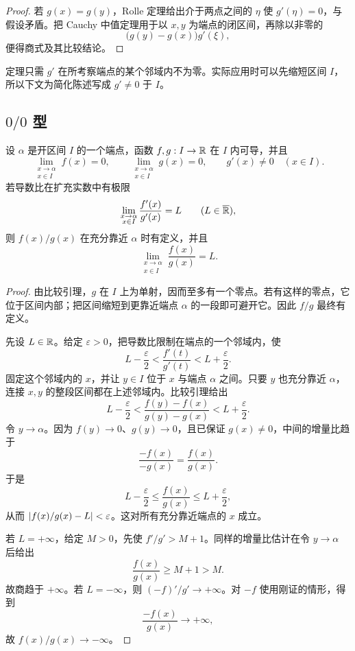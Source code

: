 \begin{proof}
若 \(g(x)=g(y)\)，Rolle 定理给出介于两点之间的 \(\eta\) 使 \(g'(\eta)=0\)，与假设矛盾。把 Cauchy 中值定理用于以 \(x,y\) 为端点的闭区间，再除以非零的
\[
 \bigl(g(y)-g(x)\bigr)g'(\xi),
\]
便得商式及其比较结论。
\end{proof}

定理只需 \(g'\) 在所考察端点的某个邻域内不为零。实际应用时可以先缩短区间 \(I\)，所以下文为简化陈述写成 \(g'\ne0\) 于 \(I\)。

\subsection{\texorpdfstring{\(0/0\)}{0/0} 型}

\begin{theorem}[L'Hôpital 法则：\(0/0\) 型]
\label{thm:lhopital-zero-zero}
设 \(\alpha\) 是开区间 \(I\) 的一个端点，函数 \(f,g:I\to\mathbb{R}\) 在 \(I\) 内可导，并且
\[
 \lim_{\substack{x\to\alpha\\x\in I}}f(x)=0,
 \qquad
 \lim_{\substack{x\to\alpha\\x\in I}}g(x)=0,
 \qquad
 g'(x)\ne0\quad(x\in I).
\]
若导数比在扩充实数中有极限
\[
 \lim_{\substack{x\to\alpha\\x\in I}}
 \frac{f'(x)}{g'(x)}=L
 \qquad(L\in\overline{\mathbb{R}}),
\]
则 \(f(x)/g(x)\) 在充分靠近 \(\alpha\) 时有定义，并且
\[
 \lim_{\substack{x\to\alpha\\x\in I}}
 \frac{f(x)}{g(x)}=L.
\]
\end{theorem}

\begin{proof}
由比较引理，\(g\) 在 \(I\) 上为单射，因而至多有一个零点。若有这样的零点，它位于区间内部；把区间缩短到更靠近端点 \(\alpha\) 的一段即可避开它。因此 \(f/g\) 最终有定义。

先设 \(L\in\mathbb{R}\)。给定 \(\varepsilon>0\)，把导数比限制在端点的一个邻域内，使
\[
 L-\frac{\varepsilon}{2}
 <
 \frac{f'(t)}{g'(t)}
 <
 L+\frac{\varepsilon}{2}.
\]
固定这个邻域内的 \(x\)，并让 \(y\in I\) 位于 \(x\) 与端点 \(\alpha\) 之间。只要 \(y\) 也充分靠近 \(\alpha\)，连接 \(x,y\) 的整段区间都在上述邻域内。比较引理给出
\[
 L-\frac{\varepsilon}{2}
 <
 \frac{f(y)-f(x)}{g(y)-g(x)}
 <
 L+\frac{\varepsilon}{2}.
\]
令 \(y\to\alpha\)。因为 \(f(y)\to0\)、\(g(y)\to0\)，且已保证 \(g(x)\ne0\)，中间的增量比趋于
\[
 \frac{-f(x)}{-g(x)}=\frac{f(x)}{g(x)}.
\]
于是
\[
 L-\frac{\varepsilon}{2}
 \le\frac{f(x)}{g(x)}
 \le L+\frac{\varepsilon}{2},
\]
从而 \(\left|f(x)/g(x)-L\right|<\varepsilon\)。这对所有充分靠近端点的 \(x\) 成立。

若 \(L=+\infty\)，给定 \(M>0\)，先使 \(f'/g'>M+1\)。同样的增量比估计在令 \(y\to\alpha\) 后给出
\[
 \frac{f(x)}{g(x)}\ge M+1>M.
\]
故商趋于 \(+\infty\)。若 \(L=-\infty\)，则 \((-f)'/g'\to+\infty\)。对 \(-f\) 使用刚证的情形，得到
\[
 \frac{-f(x)}{g(x)}\longrightarrow+\infty,
\]
故 \(f(x)/g(x)\to-\infty\)。
\end{proof}

